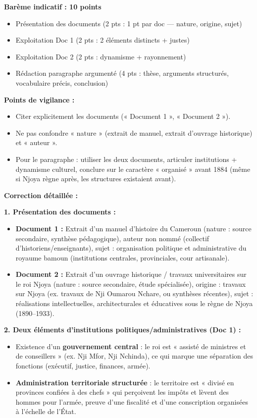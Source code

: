 \documentclass[11pt]{article}
\begin{document}
\begin{corrige}
\textbf{Barème indicatif : 10 points}
\begin{itemize}
\item Présentation des documents (2 pts : 1 pt par doc — nature, origine, sujet)
\item Exploitation Doc 1 (2 pts : 2 éléments distincts + justes)
\item Exploitation Doc 2 (2 pts : dynamisme + rayonnement)
\item Rédaction paragraphe argumenté (4 pts : thèse, arguments structurés, vocabulaire précis, conclusion)
\end{itemize}

\textbf{Points de vigilance :}
\begin{itemize}
\item Citer explicitement les documents (« Document 1 », « Document 2 »).
\item Ne pas confondre « nature » (extrait de manuel, extrait d'ouvrage historique) et « auteur ».
\item Pour le paragraphe : utiliser les deux documents, articuler institutions + dynamisme culturel, conclure sur le caractère « organisé » avant 1884 (même si Njoya règne après, les structures existaient avant).
\end{itemize}

\medskip
\textbf{Correction détaillée :}

\textbf{1. Présentation des documents :}
\begin{itemize}
\item \textbf{Document 1 :} Extrait d'un manuel d'histoire du Cameroun (nature : source secondaire, synthèse pédagogique), auteur non nommé (collectif d'historiens/enseignants), sujet : organisation politique et administrative du royaume bamoun (institutions centrales, provinciales, cour artisanale).
\item \textbf{Document 2 :} Extrait d'un ouvrage historique / travaux universitaires sur le roi Njoya (nature : source secondaire, étude spécialisée), origine : travaux sur Njoya (ex. travaux de Nji Oumarou Nchare, ou synthèses récentes), sujet : réalisations intellectuelles, architecturales et éducatives sous le règne de Njoya (1890–1933).
\end{itemize}

\textbf{2. Deux éléments d'institutions politiques/administratives (Doc 1) :}
\begin{itemize}
\item Existence d'un \textbf{gouvernement central} : le roi est « assisté de ministres et de conseillers » (ex. Nji Mfor, Nji Nchinda), ce qui marque une séparation des fonctions (exécutif, justice, finances, armée).
\item \textbf{Administration territoriale structurée} : le territoire est « divisé en provinces confiées à des chefs » qui perçoivent les impôts et lèvent des hommes pour l'armée, preuve d'une fiscalité et d'une conscription organisées à l'échelle de l'État.
\end{itemize}


\end{corrige}
\end{document}
